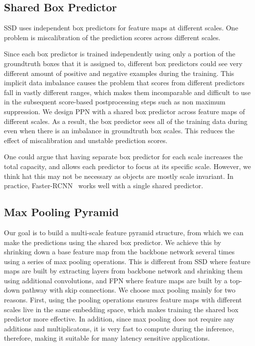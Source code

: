 \documentclass[10pt,twocolumn,letterpaper]{article}
\begin{document}
\subsection{Shared Box Predictor}
SSD uses independent box predictors for feature maps at different scales.
One problem is miscalibration of the prediction scores across different scales.

Since each box predictor is trained independently using only
a portion of the groundtruth boxes that it is assigned to,
different box predictors could see very different amount of
positive and negative examples during the training.  This
implicit data imbalance causes the problem that scores
from different predictors fall in vastly different ranges,
which makes them incomparable and difficult to use in the
subsequent score-based postprocessing steps such as non maximum
suppression.  We design PPN with a shared box predictor
across feature maps of different scales.  As a result, the
box predictor sees all of the training data during even when
there is an imbalance in groundtruth box scales. This reduces
the effect of miscalibration and unstable prediction scores.

One could argue that having separate box predictor for each
scale increases the total capacity, and allows each
predictor to focus at its specific scale. However, we think
hat this may not be necessary as objects are mostly scale
invariant. In practice, Faster-RCNN~\cite{ren2015frcnn}
works well with a single shared predictor.


\subsection{Max Pooling Pyramid}

Our goal is to build a multi-scale feature pyramid
structure, from which we can make the predictions using the
shared box predictor.  We achieve this by shrinking down a
base feature map from the backbone network several times
using a series of max pooling operations.  This is different
from SSD where feature maps are built by extracting layers
from backbone network and shrinking them using additional
convolutions, and FPN where feature maps are built by a
top-down pathway with skip connections.  We choose max
pooling mainly for two reasons.  First, using the pooling
operations ensures feature maps with different scales live
in the same embedding space, which makes training the shared
box predictor more effective.  In addition, since max
pooling does not require any additions and multiplicatons,
it is very fast to compute during the inference, therefore,
making it suitable for many latency sensitive applications.
\end{document}
